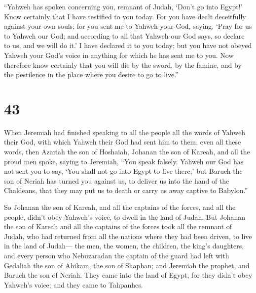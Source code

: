  ``Yahweh has spoken concerning you, remnant of Judah,
`Don't go into Egypt!' Know certainly that I have testified to you
today.  For you have dealt deceitfully against your own
souls; for you sent me to Yahweh your God, saying, `Pray for us to
Yahweh our God; and according to all that Yahweh our God says, so
declare to us, and we will do it.'  I have declared it to
you today; but you have not obeyed Yahweh your God's voice in anything
for which he has sent me to you.  Now therefore know
certainly that you will die by the sword, by the famine, and by the
pestilence in the place where you desire to go to live.''

\hypertarget{section-42}{%
\section{43}\label{section-42}}

 When Jeremiah had finished speaking to all the people all
the words of Yahweh their God, with which Yahweh their God had sent him
to them, even all these words,  then Azariah the son of
Hoshaiah, Johanan the son of Kareah, and all the proud men spoke, saying
to Jeremiah, ``You speak falsely. Yahweh our God has not sent you to
say, `You shall not go into Egypt to live there;'  but
Baruch the son of Neriah has turned you against us, to deliver us into
the hand of the Chaldeans, that they may put us to death or carry us
away captive to Babylon.''

 So Johanan the son of Kareah, and all the captains of the
forces, and all the people, didn't obey Yahweh's voice, to dwell in the
land of Judah.  But Johanan the son of Kareah and all the
captains of the forces took all the remnant of Judah, who had returned
from all the nations where they had been driven, to live in the land of
Judah---  the men, the women, the children, the king's
daughters, and every person who Nebuzaradan the captain of the guard had
left with Gedaliah the son of Ahikam, the son of Shaphan; and Jeremiah
the prophet, and Baruch the son of Neriah.  They came into
the land of Egypt, for they didn't obey Yahweh's voice; and they came to
Tahpanhes.


